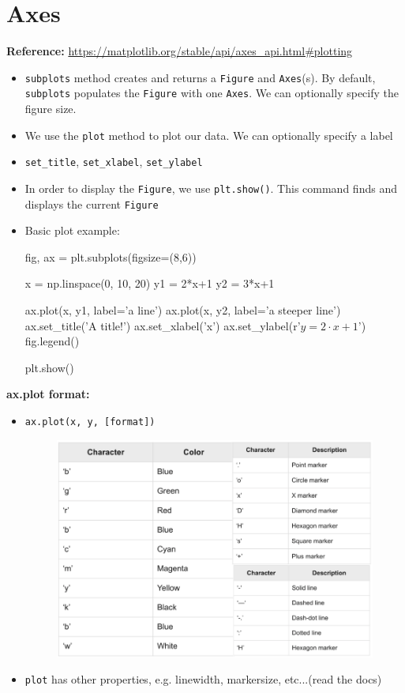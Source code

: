 \documentclass[12pt]{article}
\numberwithin{equation}{section}
\begin{document}
\section{Axes}
\textbf{Reference: }\url{https://matplotlib.org/stable/api/axes_api.html#plotting}

\begin{itemize}
    \item \verb|subplots| method creates and returns a \verb|Figure| and \verb|Axes|(s). By default, \verb|subplots| populates the \verb|Figure| with one \verb|Axes|. We can optionally specify the figure size.
    \item We use the \verb|plot| method to plot our data. We can optionally specify a label
    \item \verb|set_title|, \verb|set_xlabel|, \verb|set_ylabel|
    \item In order to display the \verb|Figure|, we use \verb|plt.show()|. This command finds and displays the current \verb|Figure|
    \item Basic plot example:
    \begin{python}
    fig, ax = plt.subplots(figsize=(8,6))

    x = np.linspace(0, 10, 20)
    y1 = 2*x+1
    y2 = 3*x+1

    ax.plot(x, y1, label='a line')
    ax.plot(x, y2, label='a steeper line')
    ax.set_title('A title!')
    ax.set_xlabel('x')
    ax.set_ylabel(r'$y = 2 \cdot x +1$')
    fig.legend()
    
    plt.show()
    \end{python}
\end{itemize}

\textbf{ax.plot format: }
\begin{itemize}
    \item \verb|ax.plot(x, y, [format])|
    \begin{figure}[H]
	    \centering
	    \includegraphics[width=14cm] {format}
    \end{figure}
    \item \verb|plot| has other properties, e.g. linewidth, markersize, etc...(read the docs)
\end{itemize}
\end{document}
